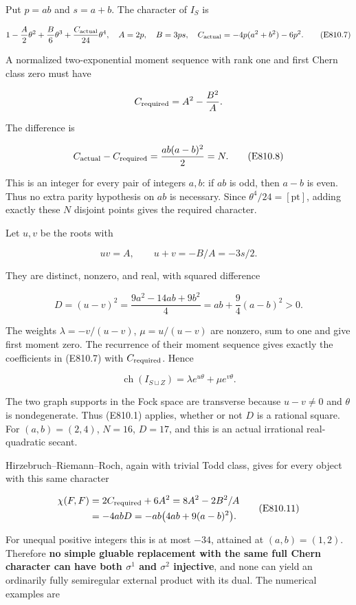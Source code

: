 Put \(p=ab\) and \(s=a+b\). The character of \(I_S\) is

\[
 1-\frac{A}{2}\theta^2+\frac{B}{6}\theta^3
        +\frac{C_{\rm actual}}{24}\theta^4,
 \quad A=2p,\quad B=3ps,\quad
 C_{\rm actual}=-4p(a^2+b^2)-6p^2.
 \tag{E810.7}
\]

A normalized two-exponential moment sequence with rank one and first
Chern class zero must have

\[
 C_{\rm required}=A^2-\frac{B^2}{A}.
\]

The difference is

\[
 C_{\rm actual}-C_{\rm required}=\frac{ab(a-b)^2}{2}=N.
 \tag{E810.8}
\]

This is an integer for every pair of integers \(a,b\): if \(ab\) is odd,
then \(a-b\) is even. Thus no extra parity hypothesis on \(ab\) is
necessary. Since \(\theta^4/24=[\mathrm{pt}]\), adding exactly these
\(N\) disjoint points gives the required character.

Let \(u,v\) be the roots with

\[
 uv=A,\qquad u+v=-B/A=-3s/2.
\]

They are distinct, nonzero, and real, with squared difference

\[
 D=(u-v)^2=\frac{9a^2-14ab+9b^2}{4}
     =ab+\frac94(a-b)^2>0.
 \tag{E810.9}
\]

The weights \(\lambda=-v/(u-v)\), \(\mu=u/(u-v)\) are nonzero, sum to
one and give first moment zero. The recurrence of their moment sequence
gives exactly the coefficients in (E810.7) with \(C_{\rm required}\).
Hence

\[
 \operatorname{ch}(I_{S\sqcup Z})=\lambda e^{u\theta}+\mu e^{v\theta}.
 \tag{E810.10}
\]

The two graph supports in the Fock space are transverse because
\(u-v\ne0\) and \(\theta\) is nondegenerate. Thus (E810.1) applies,
whether or not \(D\) is a rational square. For \((a,b)=(2,4)\),
\(N=16\), \(D=17\), and this is an actual irrational real-quadratic
secant.

Hirzebruch--Riemann--Roch, again with trivial Todd class, gives for
every object with this same character

\[
 \begin{aligned}
 \chi(F,F)
 &=2C_{\rm required}+6A^2
   =8A^2-2B^2/A\\
 &=-4abD
   =-ab\bigl(4ab+9(a-b)^2\bigr).
 \end{aligned}
 \tag{E810.11}
\]

For unequal positive integers this is at most \(-34\), attained at
\((a,b)=(1,2)\). Therefore \textbf{no simple gluable replacement with
the same full Chern character can have both \(\sigma^1\) and
\(\sigma^2\) injective}, and none can yield an ordinarily fully
semiregular external product with its dual. The numerical examples are

